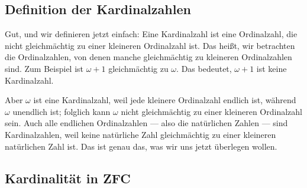 \subsection{Definition der Kardinalzahlen}

\begin{spoken-clean}[00:54:37 - 00:55:45]
Gut, und wir definieren jetzt einfach: Eine Kardinalzahl ist eine Ordinalzahl, die nicht gleichmächtig zu einer kleineren Ordinalzahl ist. Das heißt, wir betrachten die Ordinalzahlen, von denen manche gleichmächtig zu kleineren Ordinalzahlen sind. Zum Beispiel ist $\omega + 1$ gleichmächtig zu $\omega$. Das bedeutet, $\omega + 1$ ist keine Kardinalzahl.

Aber $\omega$ ist eine Kardinalzahl, weil jede kleinere Ordinalzahl endlich ist, während $\omega$ unendlich ist; folglich kann $\omega$ nicht gleichmächtig zu einer kleineren Ordinalzahl sein. Auch alle endlichen Ordinalzahlen --- also die natürlichen Zahlen --- sind Kardinalzahlen, weil keine natürliche Zahl gleichmächtig zu einer kleineren natürlichen Zahl ist. Das ist genau das, was wir uns jetzt überlegen wollen.
\end{spoken-clean}

\begin{math-stroke}
\end{math-stroke}

\subsection{Kardinalität in ZFC}


